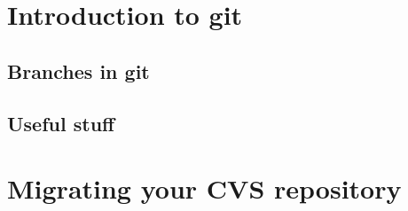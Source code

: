 \documentclass[a4paper,10pt]{article}
\begin{document}
\section{Introduction to git}
\subsection{Branches in git}
\subsection{Useful stuff}

\section{Migrating your CVS repository}
\end{document}
